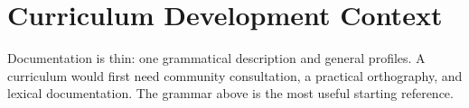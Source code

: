 \documentclass[12pt]{article}
\begin{document}
\section{Curriculum Development Context}
Documentation is thin: one grammatical description and general profiles. A curriculum would first need community consultation, a practical orthography, and lexical documentation. The grammar above is the most useful starting reference.
\end{document}
